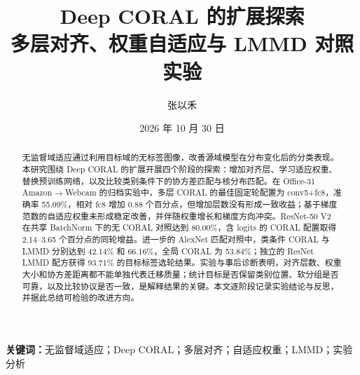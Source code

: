 \documentclass[UTF8,fontset=fandol,11pt,a4paper]{ctexart}
\title{\bfseries Deep CORAL 的扩展探索\\[3pt]\large 多层对齐、权重自适应与 LMMD 对照实验}
\author{张以禾}
\date{2026 年 10 月 30 日}
\begin{document}
\maketitle
\begin{abstract}
无监督域适应通过利用目标域的无标签图像，改善源域模型在分布变化后的分类表现。本研究围绕 Deep CORAL 的扩展开展四个阶段的探索：增加对齐层、学习适应权重、替换预训练网络，以及比较类别条件下的协方差匹配与核分布匹配。在 Office-31 Amazon$\to$Webcam 的归档实验中，多层 CORAL 的最佳固定轮配置为 conv5+fc8，准确率 55.09\%，相对 fc8 增加 0.88 个百分点，但增加层数没有形成一致收益；基于梯度范数的自适应权重未形成稳定改善，并伴随权重增长和梯度方向冲突。ResNet-50 V2 在共享 BatchNorm 下的无 CORAL 对照达到 80.00\%，含 logits 的 CORAL 配置取得 2.14--3.65 个百分点的同轮增益。进一步的 AlexNet 匹配对照中，类条件 CORAL 与 LMMD 分别达到 42.14\% 和 66.16\%，全局 CORAL 为 53.84\%；独立的 ResNet LMMD 配方获得 93.71\% 的目标标签选轮结果。实验与事后诊断表明，对齐层数、权重大小和协方差距离都不能单独代表迁移质量；统计目标是否保留类别位置、软分组是否可靠，以及比较协议是否一致，是解释结果的关键。本文逐阶段记录实验结论与反思，并据此总结可检验的改进方向。
\end{abstract}
\noindent\textbf{关键词：}无监督域适应；Deep CORAL；多层对齐；自适应权重；LMMD；实验分析


\FloatBarrier

\FloatBarrier

\FloatBarrier

\FloatBarrier



\FloatBarrier
\appendix

\end{document}
